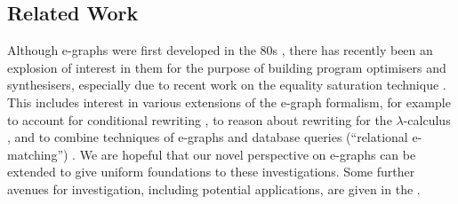 %

\subsection{Related Work}

Although e-graphs were first developed in the 80s \cite{nelson1980techniques}, there has recently been an explosion of interest in them for the purpose of building program optimisers and synthesisers, especially due to recent work on the equality saturation technique \cite{10.1145/1594834.1480915, griggio_proceedings_2022, EggPaper,flatt_small_2022}.  This includes interest in various extensions of the e-graph formalism, for example to account for conditional rewriting \cite{singher2023colored},  to reason about rewriting for the $\lambda$-calculus \cite{koehler2022sketchguided},  and to combine techniques of e-graphs and database queries (``relational e-matching'') \cite{zhang_relational_2022}. 
We are hopeful that our novel perspective on e-graphs can be extended to give uniform foundations to these investigations.  
Some further avenues for investigation, including potential applications, are given in the .

